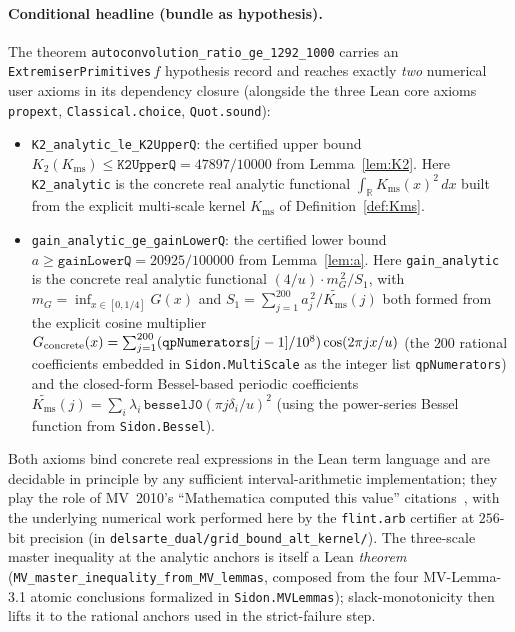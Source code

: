 \documentclass[11pt, letterpaper]{article}
\theoremstyle{paperplain}
\theoremstyle{paperdef}
\newcommand{\R}{\mathbb{R}}
\newcommand{\Kms}{K_{\mathrm{ms}}}
\begin{document}
\paragraph{Conditional headline (bundle as hypothesis).}
The theorem \texttt{autoconvolution\_ratio\_ge\_1292\_1000} carries an
\texttt{ExtremiserPrimitives}\,$f$ hypothesis record and reaches
exactly \emph{two} numerical user axioms in its dependency closure
(alongside the three Lean core axioms \texttt{propext},
\texttt{Classical.choice}, \texttt{Quot.sound}):
\begin{itemize}[leftmargin=2em]
\item \texttt{K2\_analytic\_le\_K2UpperQ}: the certified upper bound
$K_2(\Kms)\le\texttt{K2UpperQ}=47897/10000$ from
Lemma~\ref{lem:K2}.  Here \texttt{K2\_analytic} is the concrete real
analytic functional $\int_\R \Kms(x)^2\,dx$ built from the explicit
multi-scale kernel $\Kms$ of
Definition~\ref{def:Kms}.
\item \texttt{gain\_analytic\_ge\_gainLowerQ}: the certified lower bound
$a\ge\texttt{gainLowerQ}=20925/100000$ from Lemma~\ref{lem:a}.  Here
\texttt{gain\_analytic} is the concrete real analytic functional
$(4/u)\cdot m_G^{\,2}/S_1$, with $m_G=\inf_{x\in[0,1/4]}G(x)$ and
$S_1=\sum_{j=1}^{200}a_j^{\,2}/\widetilde{\Kms}(j)$ both formed from
the explicit cosine multiplier $G_{\rm concrete}(x)
=\sum_{j=1}^{200}(\texttt{qpNumerators}[j-1]/10^{8})\cos(2\pi j x/u)$
(the $200$ rational coefficients embedded in \texttt{Sidon.MultiScale}
as the integer list \texttt{qpNumerators}) and the closed-form
Bessel-based periodic coefficients $\widetilde{\Kms}(j)
=\sum_i\lambda_i\,\texttt{besselJ0}(\pi j\delta_i/u)^2$ (using the
power-series Bessel function from \texttt{Sidon.Bessel}).
\end{itemize}
Both axioms bind concrete real expressions in the Lean term
language and are decidable in principle by any sufficient
interval-arithmetic implementation; they play the role of MV~2010's
``Mathematica computed this value'' citations~\cite{MV10}, with the
underlying numerical work performed here by the \texttt{flint.arb}
certifier at $256$-bit precision (in
\texttt{delsarte\_dual/grid\_bound\_alt\_kernel/}).  The three-scale
master inequality at the analytic anchors is itself a Lean
\emph{theorem} (\texttt{MV\_master\_inequality\_from\_MV\_lemmas},
composed from the four MV-Lemma-3.1 atomic conclusions formalized in
\texttt{Sidon.MVLemmas}); slack-monotonicity then lifts it to the
rational anchors used in the strict-failure step.
\end{document}
